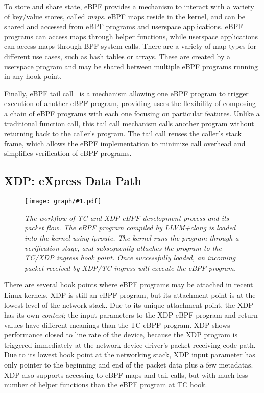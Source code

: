 \documentclass[10pt]{sigplanconf}
\newcommand{\myfig}[3]
 {
 \begin{figure}
 \centerline{\texttt{[image: graph/\#1.pdf]}}
 \caption{\sl \small #3}
 \label{#1:fig}
 \vspace*{-0.15in}
 \end{figure}
 }
\begin{document}
To store and share state, eBPF provides a mechanism to interact with a variety
of key/value stores, called \textit{maps}. eBPF maps reside in the kernel, and can be
shared and accessed from eBPF programs and userspace applications. eBPF
programs can access maps through helper functions, while userspace applications
can access maps through BPF system calls. There are a variety of map types for
different use cases, such as hash tables or arrays. These are created by a
userspace program and may be shared between multiple eBPF programs running in
any hook point.

Finally, eBPF tail call~\cite{tailcall} is a mechanism allowing one eBPF program to trigger execution of 
another eBPF program, providing users the flexibility of composing a chain of
eBPF programs with each one focusing on particular features.  Unlike a
traditional function call, this tail call mechanism calls another program
without returning back to the caller's program. The tail call reuses the
caller's stack frame, which allows the eBPF implementation to minimize call
overhead and simplifies verification of eBPF programs.

\subsection{XDP: eXpress Data Path}
\myfig{tcebpf}{2.6in}{The workflow of TC and XDP eBPF development process and its
packet flow.  The eBPF program compiled by LLVM+clang is loaded into the kernel
using iproute. The kernel runs the program through a verification stage, and
subsequently attaches the program to the TC/XDP ingress hook point.  Once
successfully loaded, an incoming packet received by XDP/TC ingress will execute the
eBPF program.}

There are several hook points where eBPF programs may be attached in recent
Linux kernels. XDP is still an eBPF program, but its attachment point is at the
lowest level of the network stack.  Due to its unique attachment point, the XDP
has its own {\em context}; the input parameters to the XDP eBPF program and return
values have different meanings than the TC eBPF program. XDP shows performance
closed to line rate of the device, because the XDP program is triggered immediately
at the network device driver's packet receiving code path.
Due to its lowest hook point at the networking stack, XDP input parameter has only
pointer to the beginning and end of the packet data plus a few metadatas.
XDP also supports accessing to eBPF maps and tail calls, but with much
less number of helper functions than the eBPF program at TC hook.
\end{document}
